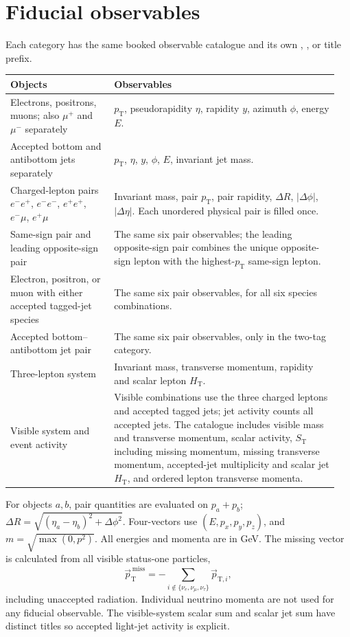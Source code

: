 \documentclass[10pt,a4paper]{article}
\newcommand{\pt}{p_{\mathrm T}}
\newcommand{\code}[1]{\texttt{\detokenize{#1}}}
\begin{document}
\section{Fiducial observables}
Each category has the same booked observable catalogue and its own
\code{fiducial 0b}, \code{fiducial 1b}, or \code{fiducial 2b} title prefix.
\begin{longtable}{@{}p{0.30\linewidth}p{0.65\linewidth}@{}}
\toprule Objects & Observables\\ \midrule \endhead
Electrons, positrons, muons; also $\mu^+$ and $\mu^-$ separately &
$\pt$, pseudorapidity $\eta$, rapidity $y$, azimuth $\phi$, energy $E$.\\
Accepted bottom and antibottom jets separately &
$\pt$, $\eta$, $y$, $\phi$, $E$, invariant jet mass.\\
Charged-lepton pairs $e^-e^+$, $e^-e^-$, $e^+e^+$, $e^-\mu$, $e^+\mu$ &
Invariant mass, pair $\pt$, pair rapidity, $\Delta R$, $|\Delta\phi|$,
$|\Delta\eta|$. Each unordered physical pair is filled once.\\
Same-sign pair and leading opposite-sign pair &
The same six pair observables; the leading opposite-sign pair combines the
unique opposite-sign lepton with the highest-$\pt$ same-sign lepton.\\
Electron, positron, or muon with either accepted tagged-jet species &
The same six pair observables, for all six species combinations.\\
Accepted bottom--antibottom jet pair &
The same six pair observables, only in the two-tag category.\\
Three-lepton system &
Invariant mass, transverse momentum, rapidity and scalar lepton
$H_{\mathrm T}$.\\
Visible system and event activity &
Visible combinations use the three charged leptons and accepted tagged jets;
jet activity counts all accepted jets. The catalogue includes visible mass
and transverse momentum, scalar activity, $S_{\mathrm T}$ including missing
momentum, missing transverse momentum, accepted-jet multiplicity and scalar
jet $H_{\mathrm T}$, and ordered lepton transverse momenta.\\
\bottomrule
\end{longtable}

For objects $a,b$, pair quantities are evaluated on $p_a+p_b$;
$\Delta R=\sqrt{(\eta_a-\eta_b)^2+\Delta\phi^2}$. Four-vectors use
$(E,p_x,p_y,p_z)$, and $m=\sqrt{\max(0,p^2)}$. All energies and momenta
are in GeV. The missing vector is calculated from all visible status-one
particles,
\[
 \vec p_{\mathrm T}^{\,\mathrm{miss}}=
 -\sum_{i\notin\{\nu_e,\nu_\mu,\nu_\tau\}}\vec p_{\mathrm T,i},
\]
including unaccepted radiation. Individual neutrino momenta are not used
for any fiducial observable. The visible-system scalar sum and scalar jet
sum have distinct titles so accepted light-jet activity is explicit.
\end{document}
